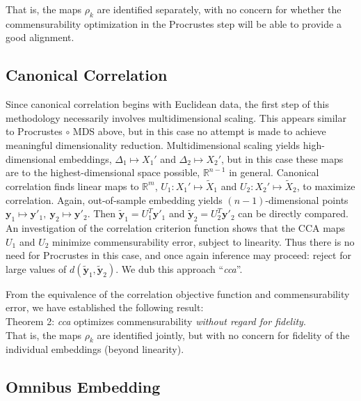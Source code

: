 \documentclass[12pt,xcolor]{article}
\newcommand{\1}{\ensuremath{\mbox{{\bf 1}}}}
\begin{document}
That is, the maps $\rho_k$ are identified separately, with no concern for whether
the commensurability optimization in
the Procrustes step will be able to provide a good alignment.

\subsection{Canonical Correlation}

Since canonical correlation begins with Euclidean data,
the first step of this methodology necessarily involves multidimensional scaling.
This appears similar to Procrustes $\circ$ MDS above,
but in this case no attempt is made to achieve meaningful dimensionality reduction.
Multidimensional scaling yields high-dimensional embeddings, $\Delta_1 \mapsto X_1'$ and $\Delta_2 \mapsto X_2'$,
but in this case these maps are to the highest-dimensional space possible, $\mathbb{R}^{n-1}$ in general.
Canonical correlation finds linear maps to $\mathbb{R}^m$, $U_1: X_1' \mapsto \widetilde{X}_1$ and $U_2: X_2' \mapsto \widetilde{X}_2$, to maximize correlation.
Again, out-of-sample embedding yields $(n-1)$-dimensional points
$\bm{y}_1 \mapsto {\bm{y}}'_1, \ \bm{y}_2 \mapsto {\bm{y}}'_2$.
Then $\widetilde{\bm{y}}_1 = U_1^T {\bm{y}}'_1$ and $\widetilde{\bm{y}}_2 = U_2^T {\bm{y}}'_2$ can be directly compared.
An investigation of the correlation criterion function shows that
the CCA maps $U_1$ and $U_2$ minimize commensurability error, subject to linearity.
Thus there is no need for Procrustes in this case,
and once again inference may proceed:
reject for large values of $d(\widetilde{\bm{y}}_1,\widetilde{\bm{y}}_2)$.
We dub this approach ``{\it cca}''.

From the equivalence of the correlation objective function and commensurability error, we have established the following result:
\\

  Theorem 2: {\it cca} optimizes commensurability {\em without regard for fidelity}.
\\

That is, the maps $\rho_k$ are identified jointly, but with no concern for fidelity of the individual embeddings
(beyond linearity).

\subsection{Omnibus Embedding}\label{section:omnibus}
\end{document}
